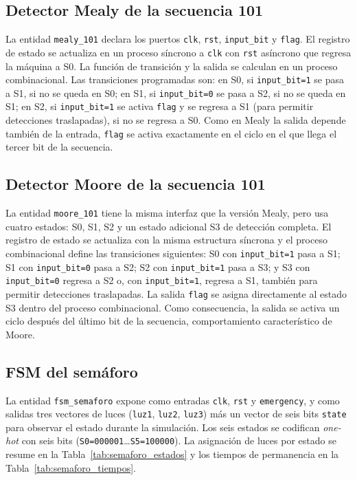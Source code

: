 \documentclass[12pt,letterpaper]{article}
\begin{document}
\subsection{Detector Mealy de la secuencia 101}
La entidad \texttt{mealy\_101} declara los puertos \texttt{clk}, \texttt{rst}, \texttt{input\_bit} y \texttt{flag}. El registro de estado se actualiza en un proceso síncrono a \texttt{clk} con \texttt{rst} asíncrono que regresa la máquina a S0. La función de transición y la salida se calculan en un proceso combinacional. Las transiciones programadas son: en S0, si \texttt{input\_bit=1} se pasa a S1, si no se queda en S0; en S1, si \texttt{input\_bit=0} se pasa a S2, si no se queda en S1; en S2, si \texttt{input\_bit=1} se activa \texttt{flag} y se regresa a S1 (para permitir detecciones traslapadas), si no se regresa a S0. Como en Mealy la salida depende también de la entrada, \texttt{flag} se activa exactamente en el ciclo en el que llega el tercer bit de la secuencia.

\subsection{Detector Moore de la secuencia 101}
La entidad \texttt{moore\_101} tiene la misma interfaz que la versión Mealy, pero usa cuatro estados: S0, S1, S2 y un estado adicional S3 de detección completa. El registro de estado se actualiza con la misma estructura síncrona y el proceso combinacional define las transiciones siguientes: S0 con \texttt{input\_bit=1} pasa a S1; S1 con \texttt{input\_bit=0} pasa a S2; S2 con \texttt{input\_bit=1} pasa a S3; y S3 con \texttt{input\_bit=0} regresa a S2 o, con \texttt{input\_bit=1}, regresa a S1, también para permitir detecciones traslapadas. La salida \texttt{flag} se asigna directamente al estado S3 dentro del proceso combinacional. Como consecuencia, la salida se activa un ciclo después del último bit de la secuencia, comportamiento característico de Moore.

\subsection{FSM del semáforo}
La entidad \texttt{fsm\_semaforo} expone como entradas \texttt{clk}, \texttt{rst} y \texttt{emergency}, y como salidas tres vectores de luces (\texttt{luz1}, \texttt{luz2}, \texttt{luz3}) más un vector de seis bits \texttt{state} para observar el estado durante la simulación. Los seis estados se codifican \textit{one-hot} con seis bits (\texttt{S0=000001}\ldots\texttt{S5=100000}). La asignación de luces por estado se resume en la Tabla~\ref{tab:semaforo_estados} y los tiempos de permanencia en la Tabla~\ref{tab:semaforo_tiempos}.
\end{document}
